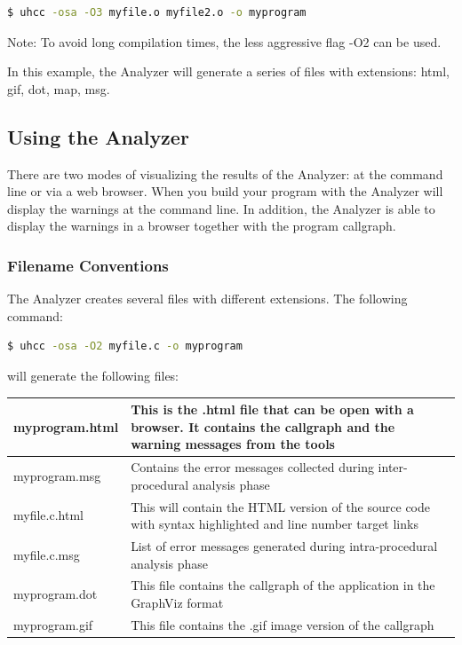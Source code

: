 \begin{lstlisting}[language=bash]
  $ uhcc -osa -O3 myfile.o myfile2.o -o myprogram 
\end{lstlisting}

Note: To avoid long compilation times, the less aggressive flag -O2
can be used.

In this example, the \openshmem Analyzer will generate a
series of files with extensions: html, gif, dot, map, msg.

\subsection{Using the \openshmem Analyzer}

There are two modes of visualizing the results of the \openshmem
Analyzer: at the command line or via a web browser. When you build
your program with the \openshmem Analyzer will display the warnings at
the command line. In addition, the \openshmem Analyzer is able to
display the warnings in a browser together with the program callgraph.

\subsubsection{Filename Conventions}

The \openshmem Analyzer creates several files with different extensions. 
The following command:

\begin{lstlisting}[language=bash]
  $ uhcc -osa -O2 myfile.c -o myprogram
\end{lstlisting}

will generate the following files:

\vspace{0.1in}

\begin{center}
  \begin{tabular}{| l | p{10cm} |}
    \hline
    myprogram.html & This is the .html file that can be open with a browser. It contains the callgraph and the warning messages from the tools \\
    \hline
    myprogram.msg & Contains the error messages collected during inter-procedural analysis phase \\
    \hline
    myfile.c.html & This will contain the HTML version of the source code with syntax highlighted and line number target links \\
    \hline
    myfile.c.msg & List of error messages generated during intra-procedural analysis phase \\
    \hline
    myprogram.dot & This file contains the callgraph of the application in the GraphViz format \\
    \hline
    myprogram.gif & This file contains the .gif image version of the callgraph \\
    \hline
  \end{tabular}
\end{center}

